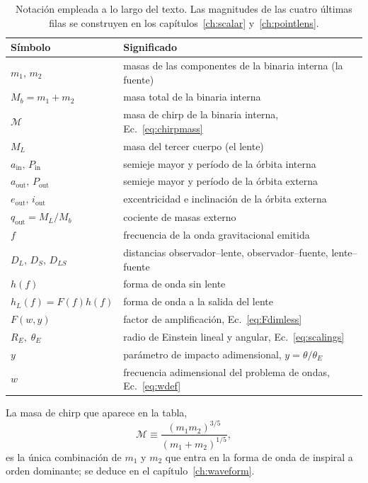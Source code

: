 \documentclass[11pt,a4paper,openany]{book}
\newcommand{\ain}{a_{\mathrm{in}}}
\newcommand{\aout}{a_{\mathrm{out}}}
\begin{document}
\begin{table}[htbp]
  \centering
  \small
  \begin{tabular}{ll}
    \toprule
    S\'imbolo & Significado \\
    \midrule
    $m_1,\,m_2$ & masas de las componentes de la binaria interna (la fuente) \\
    $M_b=m_1+m_2$ & masa total de la binaria interna \\
    $\mathcal{M}$ & masa de chirp de la binaria interna, Ec.~\eqref{eq:chirpmass} \\
    $M_L$ & masa del tercer cuerpo (el lente) \\
    $\ain,\,P_\mathrm{in}$ & semieje mayor y per\'iodo de la \'orbita interna \\
    $\aout,\,P_\mathrm{out}$ & semieje mayor y per\'iodo de la \'orbita externa \\
    $e_\mathrm{out},\,i_\mathrm{out}$ & excentricidad e inclinaci\'on de la \'orbita externa \\
    $q_\mathrm{out}=M_L/M_b$ & cociente de masas externo \\
    $f$ & frecuencia de la onda gravitacional emitida \\
    $D_L,\,D_S,\,D_{LS}$ & distancias observador--lente, observador--fuente, lente--fuente \\
    $h(f)$ & forma de onda sin lente \\
    $h_L(f)=F(f)h(f)$ & forma de onda a la salida del lente \\
    $F(w,y)$ & factor de amplificaci\'on, Ec.~\eqref{eq:Fdimless} \\
    $R_E,\;\theta_E$ & radio de Einstein lineal y angular, Ec.~\eqref{eq:scalings} \\
    $y$ & par\'ametro de impacto adimensional, $y=\theta/\theta_E$ \\
    $w$ & frecuencia adimensional del problema de ondas, Ec.~\eqref{eq:wdef} \\
    \bottomrule
  \end{tabular}
  \caption{Notaci\'on empleada a lo largo del texto. Las magnitudes de las
  cuatro \'ultimas filas se construyen en los cap\'itulos~\ref{ch:scalar}
  y~\ref{ch:pointlens}.}
  \label{tab:notacion}
\end{table}

La masa de chirp que aparece en la tabla,
\begin{equation}
  \mathcal{M}\equiv\frac{(m_1m_2)^{3/5}}{(m_1+m_2)^{1/5}},
  \label{eq:chirpmass}
\end{equation}
es la \'unica combinaci\'on de $m_1$ y $m_2$ que entra en la forma de onda de
inspiral a orden dominante; se deduce en el cap\'itulo~\ref{ch:waveform}.
\end{document}
